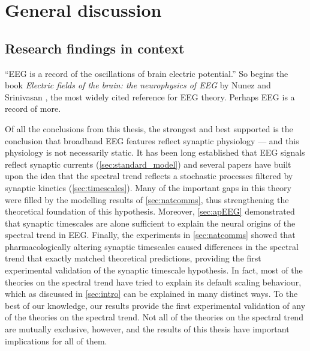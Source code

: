 \chapter{General discussion}
\label{sec:conclusion}

\section{Research findings in context}
``EEG is a record of the oscillations of brain electric potential.'' So begins the book \textit{Electric fields of the brain: the neurophysics of EEG} by Nunez and Srinivasan \cite{Nunez2006}, the most widely cited reference for EEG theory. Perhaps EEG is a record of more.

Of all the conclusions from this thesis, the strongest and best supported is the conclusion that broadband EEG features reflect synaptic physiology --- and this physiology is not necessarily static. It has been long established that EEG signals reflect synaptic currents (\autoref{sec:standard_model}) and several papers have built upon the idea that the spectral trend reflects a stochastic processes filtered by synaptic kinetics (\autoref{sec:timescales}). Many of the important gaps in this theory were filled by the modelling results of \autoref{sec:natcomms}, thus strengthening the theoretical foundation of this hypothesis. Moreover, \autoref{sec:apEEG} demonstrated that synaptic timescales are alone sufficient to explain the neural origins of the spectral trend in EEG. Finally, the experiments in  \autoref{sec:natcomms} showed that pharmacologically altering synaptic timescales caused differences in the spectral trend that exactly matched theoretical predictions, providing the first experimental validation of the synaptic timescale hypothesis. In fact, most of the theories on the spectral trend have tried to explain its default scaling behaviour, which as discussed in \autoref{sec:intro} can be explained in many distinct ways. To the best of our knowledge, our results provide the first experimental validation of any of the theories on the spectral trend. Not all of the theories on the spectral trend are mutually exclusive, however, and the results of this thesis have important implications for all of them.

